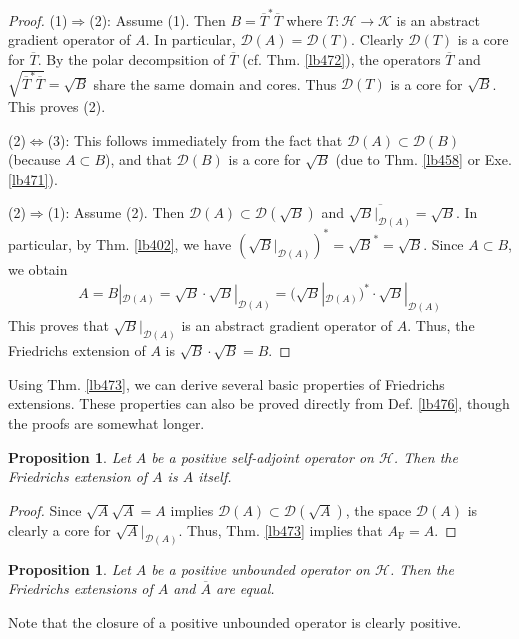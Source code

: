 \documentclass[12pt,b5paper,notitlepage]{article}
\theoremstyle{definition}
\theoremstyle{plain}
\newtheorem{pp}[df]{Proposition}
\newcommand{\ovl}{\overline}
\newcommand{\Dom}{\mathscr{D}}
\newcommand{\MH}{\mathcal H}
\newcommand{\MK}{\mathcal K}
\newcommand{\Frm}{{\mathrm F}}
\numberwithin{equation}{section}
\begin{document}
\begin{proof}
(1)$\Rightarrow$(2): Assume (1). Then $B=\ovl T^*\ovl T$ where $T:\MH\rightarrow\MK$ is an abstract gradient operator of $A$. In particular, $\Dom(A)=\Dom(T)$. Clearly $\Dom(T)$ is a core for $\ovl T$. By the polar decompsition of $\ovl T$ (cf. Thm. \ref{lb472}), the operators $\ovl T$ and $\sqrt{\ovl T^*\ovl T}=\sqrt B$ share the same domain and cores. Thus $\Dom(T)$ is a core for $\sqrt B$. This proves (2).

(2)$\Leftrightarrow$(3): This follows immediately from the fact that $\Dom(A)\subset\Dom(B)$ (because $A\subset B$), and that $\Dom(B)$ is a core for $\sqrt B$ (due to Thm. \ref{lb458} or Exe. \ref{lb471}). 

(2)$\Rightarrow$(1): Assume (2). Then $\Dom(A)\subset\Dom(\sqrt B)$ and $\ovl{\sqrt B|_{\Dom(A)}}=\sqrt B$. In particular, by Thm. \ref{lb402}, we have $(\sqrt B|_{\Dom(A)})^*=\sqrt B^*=\sqrt B$. Since $A\subset B$, we obtain
\begin{align*}
A=B|_{\Dom(A)}=\sqrt B\cdot\sqrt B|_{\Dom(A)}=(\sqrt B|_{\Dom(A)})^*\cdot\sqrt B|_{\Dom(A)}
\end{align*}
This proves that $\sqrt B|_{\Dom(A)}$ is an abstract gradient operator of $A$. Thus, the Friedrichs extension of $A$ is $\sqrt B\cdot\sqrt B=B$.
\end{proof}





Using Thm. \ref{lb473}, we can derive several basic properties of Friedrichs extensions. These properties can also be proved directly from Def. \ref{lb476}, though the proofs are somewhat longer.


\begin{pp}
Let $A$ be a positive self-adjoint operator on $\MH$. Then the Friedrichs extension of $A$ is $A$ itself.
\end{pp}


\begin{proof}
Since $\sqrt A\sqrt A=A$ implies $\Dom(A)\subset\Dom(\sqrt A)$, the space $\Dom(A)$ is clearly a core for $\sqrt A|_{\Dom(A)}$. Thus, Thm. \ref{lb473} implies that $A_\Frm=A$.
\end{proof}


\begin{pp}
Let $A$ be a positive unbounded operator on $\MH$. Then the Friedrichs extensions of $A$ and $\ovl A$ are equal.
\end{pp}

Note that the closure of a positive unbounded operator is clearly positive.
\end{document}
